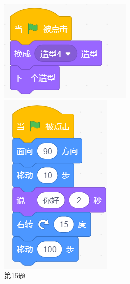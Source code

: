 \documentclass[10pt, a4paper]{article}
\begin{document}
\begin{enumerate}
        \begin{figure}[htbp]
            \centering
            \begin{minipage}[t]{.18\textwidth}
                \centering
                \includegraphics[width=\textwidth]{15.png}
                \caption*{第15题}
            \end{minipage}
            \begin{minipage}[t]{.15\textwidth}
                \centering
                \includegraphics[width=.7\textwidth]{19.png}

\end{minipage}
\end{figure}
\end{enumerate}
\end{document}
